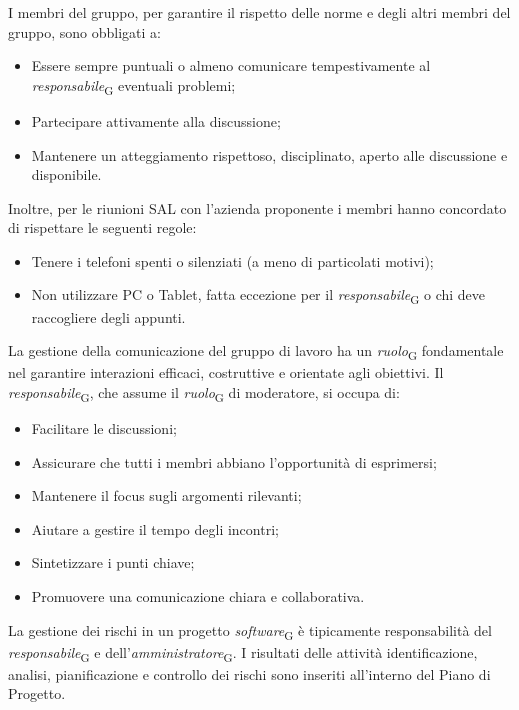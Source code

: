 I membri del gruppo, per garantire il rispetto delle norme e degli altri membri del gruppo, sono obbligati a:
\begin{itemize}
    \item Essere sempre puntuali o almeno comunicare tempestivamente al \textit{responsabile}\textsubscript{G} eventuali problemi;
    \item Partecipare attivamente alla discussione;
    \item Mantenere un atteggiamento rispettoso, disciplinato, aperto alle discussione e disponibile.
\end{itemize}
Inoltre, per le riunioni SAL con l'azienda proponente i membri hanno concordato di rispettare le seguenti regole:
\begin{itemize}
    \item Tenere i telefoni spenti o silenziati (a meno di particolati motivi);
    \item Non utilizzare PC o Tablet, fatta eccezione per il \textit{responsabile}\textsubscript{G} o chi deve raccogliere degli appunti.
\end{itemize}

La gestione della comunicazione del gruppo di lavoro ha un \textit{ruolo}\textsubscript{G} fondamentale nel garantire interazioni efficaci, costruttive e orientate agli obiettivi. Il \textit{responsabile}\textsubscript{G}, che assume il \textit{ruolo}\textsubscript{G} di moderatore, si occupa di:
\begin{itemize}
    \item Facilitare le discussioni;
    \item Assicurare che tutti i membri abbiano l’opportunità di esprimersi;
    \item Mantenere il focus sugli argomenti rilevanti;
    \item Aiutare a gestire il tempo degli incontri;
    \item Sintetizzare i punti chiave;
    \item Promuovere una comunicazione chiara e collaborativa.
\end{itemize}

La gestione dei rischi in un progetto \textit{software}\textsubscript{G} è tipicamente responsabilità del \textit{responsabile}\textsubscript{G} e dell'\textit{amministratore}\textsubscript{G}. I risultati delle attività identificazione, analisi, pianificazione e controllo dei rischi sono inseriti all'interno del Piano di Progetto.

